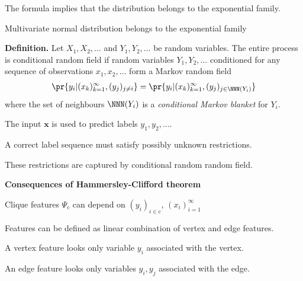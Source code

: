 \documentclass[landscape,footrule]{foils}
\renewcommand{\vec}[1]{\boldsymbol{#1}}
\begin{document}
The formula implies that the distribution belongs to the exponential family.

\begin{triangles}
\item Multivariate normal distribution belongs to the exponential family
\end{triangles}




\textbf{Definition.}
Let $X_1,X_2,\ldots$ and $Y_1,Y_2,\ldots$ be random variables. The entire process is conditional random field if random variables $Y_1,Y_2,\ldots$ conditioned for any sequence of observations $x_1,x_2,\ldots$ form a Markov random field
\begin{align*}
\pr{y_i|(x_k)_{k=1}^\infty, (y_j)_{j\neq i}}=\pr{y_i|(x_k)_{k=1}^\infty, (y_j)_{j\in\NNN(Y_i)} }
\end{align*}
where the set of neighbours $\NNN(Y_i)$ is a \emph{conditional Markov blanket} for $Y_i$. 



\enlargethispage{1cm}


\begin{triangles}
\item The input $\vec{x}$ is used to predict labels $y_1,y_2,\ldots$.
\item A correct label sequence must satisfy possibly unknown restrictions.
\item These restrictions are captured by conditional random random field.
\end{triangles}\vspace*{0.5cm}


\textbf{Consequences of Hammersley-Clifford theorem}
\begin{triangles}
\item Clique features $\Psi_c$ can depend on $(y_i)_{i\in c}$, $(x_i)_{i=1}^\infty$ 
\item Features can be defined as linear combination of vertex and edge features.
\item A vertex feature looks only variable $y_i$ associated with the vertex.
\item An edge feature looks only variables $y_i, y_j$ associated with the edge.
\end{triangles}
\end{document}
